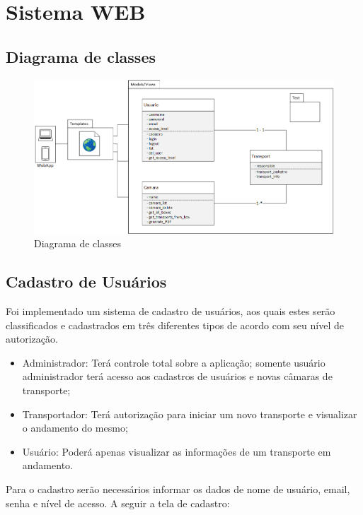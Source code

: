 			
			
\section{Sistema WEB}

\subsection{Diagrama de classes}

\begin{figure}[H]
	\centering
	\includegraphics[width=16cm]{figuras/diagrama_classe.png}
	\caption{Diagrama de classes}
\end{figure}


\subsection{Cadastro de Usuários}
	Foi implementado um sistema de cadastro de usuários, aos quais estes serão classificados e cadastrados em três diferentes tipos de acordo com seu nível de autorização.

\begin{itemize}
\item Administrador: Terá controle total sobre a aplicação; somente usuário administrador terá acesso aos cadastros de usuários e novas câmaras de transporte;
\item Transportador:  Terá autorização para iniciar um novo transporte e visualizar o andamento do mesmo;
\item Usuário: Poderá apenas visualizar as informações de um transporte em andamento.
\end{itemize}

	Para o cadastro serão necessários informar os dados de nome de usuário, email, senha e nível de acesso. A seguir a tela de cadastro:

